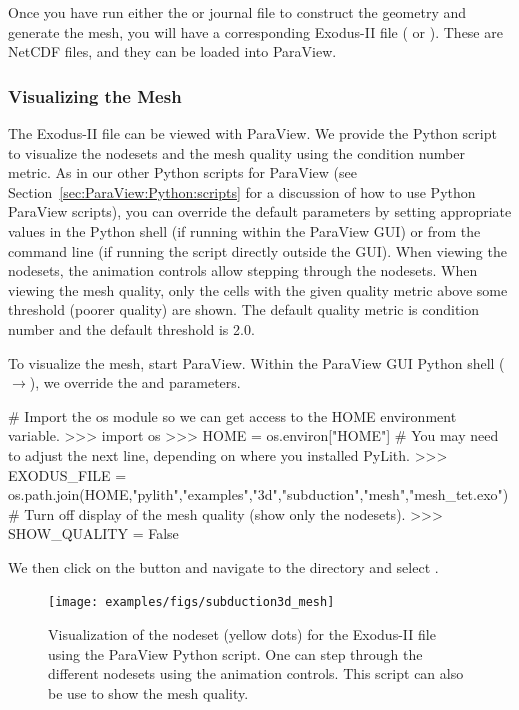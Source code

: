 Once you have run either the  or
journal file to construct the geometry and
generate the mesh, you will have a corresponding Exodus-II file
( or ). These are
NetCDF files, and they can be loaded into ParaView.

\subsubsection{Visualizing the Mesh}

The Exodus-II file  can be viewed with
ParaView. We provide the Python script  to
visualize the nodesets and the mesh quality using the condition number
metric. As in our other Python scripts for ParaView (see
Section~\vref{sec:ParaView:Python:scripts} for a discussion of how to use
Python ParaView scripts), you can override the default
parameters by setting appropriate values in the Python shell (if
running within the ParaView GUI) or from the command line (if running
the script directly outside the GUI). When viewing the nodesets, the
animation controls allow stepping through the nodesets. When viewing
the mesh quality, only the cells with the given quality metric above
some threshold (poorer quality) are shown. The default quality metric
is condition number and the default threshold is 2.0.

To visualize the mesh, start ParaView. Within the ParaView GUI Python shell
($\rightarrow$), we override the
 and  parameters.
\begin{python}
# Import the os module so we can get access to the HOME environment variable.
>>> import os
>>> HOME = os.environ["HOME"]
# You may need to adjust the next line, depending on where you installed PyLith.
>>> EXODUS_FILE = os.path.join(HOME,"pylith","examples","3d","subduction","mesh","mesh_tet.exo")
# Turn off display of the mesh quality (show only the nodesets).
>>> SHOW_QUALITY = False
\end{python}
We then click on the  button and navigate to the
 directory and select
.

\begin{figure}[htbp]
  \texttt{[image: examples/figs/subduction3d\_mesh]}
  \caption{Visualization of the  nodeset
    (yellow dots) for the Exodus-II file 
    using the  ParaView Python script. One
    can step through the different nodesets using the animation
    controls. This script can also be use to show the mesh quality.}
  \label{fig:example:subduction:3d:mesh}
\end{figure}

